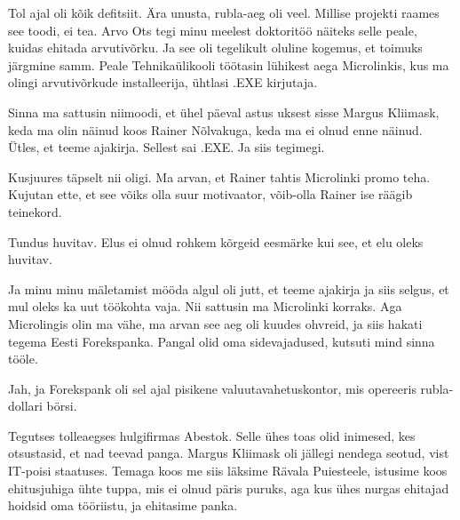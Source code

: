 
Tol ajal oli kõik defitsiit. Ära unusta, rubla-aeg oli veel. Millise projekti raames see toodi, ei tea. Arvo Ots tegi minu meelest doktoritöö näiteks selle peale, kuidas ehitada arvutivõrku. Ja see oli tegelikult oluline kogemus, et toimuks järgmine samm. Peale Tehnikaülikooli töötasin lühikest aega Microlinkis, kus ma olingi arvutivõrkude installeerija, ühtlasi .EXE kirjutaja.


Sinna ma sattusin niimoodi, et ühel päeval astus uksest sisse Margus Kliimask, keda ma olin näinud koos Rainer Nõlvakuga, keda ma ei olnud enne näinud. Ütles, et teeme ajakirja. Sellest sai .EXE. Ja siis tegimegi.


Kusjuures täpselt nii oligi. Ma arvan, et Rainer tahtis Microlinki promo teha. Kujutan ette, et see võiks olla suur motivaator, võib-olla Rainer ise räägib teinekord.


Tundus huvitav. Elus ei olnud rohkem kõrgeid eesmärke kui see, et elu oleks huvitav.


Ja minu minu mäletamist mööda algul oli jutt, et teeme ajakirja ja siis selgus, et mul oleks ka uut töökohta vaja. Nii sattusin ma Microlinki korraks. Aga Microlingis olin ma vähe, ma arvan see aeg oli kuudes ohvreid, ja siis hakati tegema Eesti Forekspanka. Pangal olid oma sidevajadused, kutsuti mind sinna tööle.


Jah, ja Forekspank oli sel ajal pisikene valuutavahetuskontor, mis opereeris rubla-dollari börsi.

Tegutses tolleaegses hulgifirmas Abestok. Selle  ühes toas olid inimesed, kes otsustasid, et nad teevad panga. Margus Kliimask oli jällegi nendega seotud, vist IT-poisi staatuses. Temaga koos me siis läksime Rävala Puiesteele, istusime koos ehitusjuhiga ühte tuppa, mis ei olnud päris puruks, aga kus ühes nurgas ehitajad hoidsid oma tööriistu, ja ehitasime panka.

